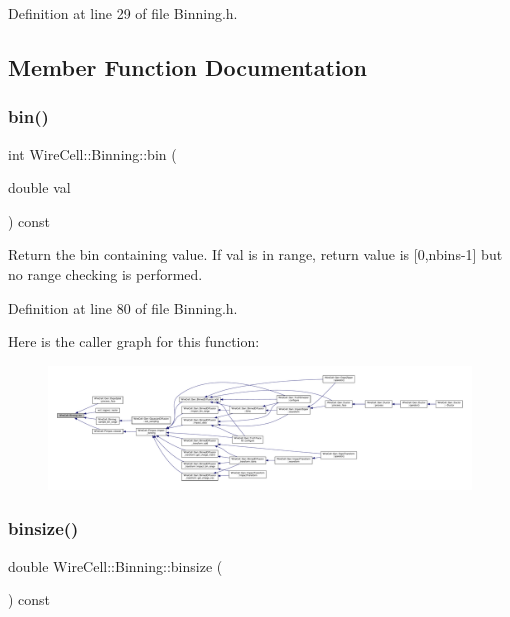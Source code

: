 Definition at line 29 of file Binning.\+h.



\subsection{Member Function Documentation}
\mbox{\label{class_wire_cell_1_1_binning_a826dbaafb7bc50a2c2767cc4deb190f0}} 
\subsubsection{\texorpdfstring{bin()}{bin()}}
{\footnotesize\ttfamily int Wire\+Cell\+::\+Binning\+::bin (\begin{DoxyParamCaption}\item[{double}]{val }\end{DoxyParamCaption}) const\hspace{0.3cm}{\ttfamily [inline]}}

Return the bin containing value. If val is in range, return value is \mbox{[}0,nbins-\/1\mbox{]} but no range checking is performed. 

Definition at line 80 of file Binning.\+h.

Here is the caller graph for this function\+:
\nopagebreak
\begin{figure}[H]
\begin{center}
\leavevmode
\includegraphics[width=350pt]{class_wire_cell_1_1_binning_a826dbaafb7bc50a2c2767cc4deb190f0_icgraph}
\end{center}
\end{figure}
\mbox{\label{class_wire_cell_1_1_binning_a55ba6a476ed35f5954fd44214e85dbb9}} 
\subsubsection{\texorpdfstring{binsize()}{binsize()}}
{\footnotesize\ttfamily double Wire\+Cell\+::\+Binning\+::binsize (\begin{DoxyParamCaption}{ }\end{DoxyParamCaption}) const\hspace{0.3cm}{\ttfamily [inline]}}



